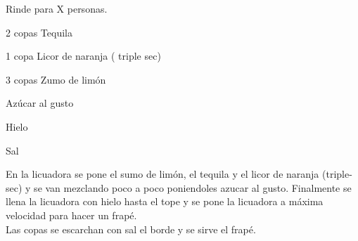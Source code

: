 
Rinde para X personas.

\begin{ingredientes}
\item 2 copas Tequila
\item 1 copa Licor de naranja ( triple sec)
\item 3 copas Zumo de limón
\item Azúcar al gusto
\item Hielo
\item Sal
\end{ingredientes}
\preparacion
En la licuadora se pone el sumo de limón, el tequila y el licor de naranja (triple-sec) y se van mezclando poco a poco poniendoles azucar al gusto. Finalmente se llena la licuadora con hielo hasta el tope y se pone la licuadora a máxima velocidad para hacer un frapé.\\

Las copas se escarchan con sal el borde y se sirve el frapé.
